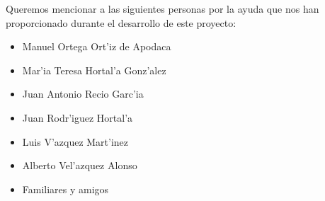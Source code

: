 Queremos mencionar a las siguientes personas por la ayuda que nos han proporcionado durante el desarrollo de este proyecto:
\begin{itemize}
\item Manuel Ortega Ort'iz de Apodaca
\item Mar'ia Teresa Hortal'a Gonz'alez
\item Juan Antonio Recio Garc'ia
\item Juan Rodr'iguez Hortal'a
\item Luis V'azquez  Mart'inez
\item Alberto Vel'azquez Alonso
\item Familiares y amigos
\end{itemize}